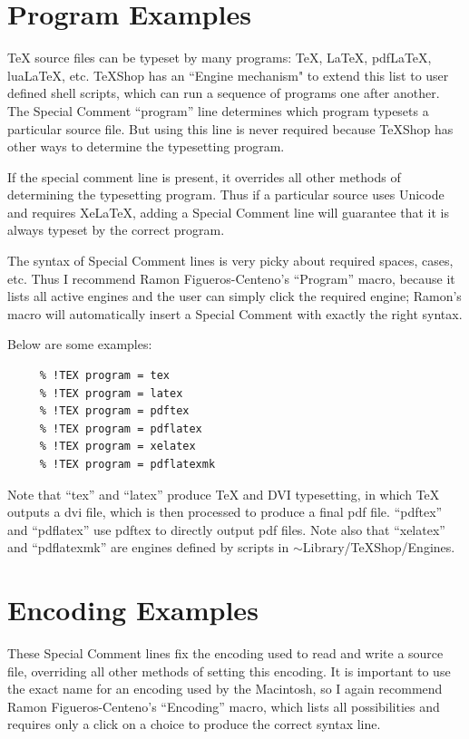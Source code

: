 \documentclass[11pt, oneside]{article}   	%
\begin{document}
\section{Program Examples}

TeX source files can be typeset by many programs: TeX, LaTeX, pdfLaTeX, luaLaTeX, etc. TeXShop has an ``Engine mechanism" to extend this list to user defined shell scripts, which can run a sequence of programs one after another. The Special Comment ``program'' line determines which program typesets a particular source file. But using this line is never required because TeXShop has other ways to determine the typesetting program.

If the special comment line is present, it overrides all other methods of determining the typesetting program. Thus if a particular source uses Unicode and requires XeLaTeX, adding a Special Comment line will guarantee that it is always typeset by the correct program.

The syntax of Special Comment lines is very picky about required spaces, cases, etc. Thus I recommend 
Ramon Figueros-Centeno's ``Program'' macro, because it lists all active engines and the user can simply click the required engine; Ramon's macro will automatically insert a Special Comment with exactly the right syntax.

Below are some examples:

\begin{verbatim}
     % !TEX program = tex               
     % !TEX program = latex
     % !TEX program = pdftex
     % !TEX program = pdflatex
     % !TEX program = xelatex
     % !TEX program = pdflatexmk
\end{verbatim}

Note that ``tex'' and ``latex'' produce TeX and DVI typesetting, in which TeX outputs a dvi file, which is then processed to produce a final pdf file. ``pdftex'' and ``pdflatex'' use pdftex to directly output pdf files.
Note also that ``xelatex'' and ``pdflatexmk'' are engines defined by scripts in $\sim$Library/TeXShop/Engines.

\section{Encoding Examples}

These Special Comment lines fix the encoding used to read and write a source file, overriding all other methods of setting this encoding. It is important to use the exact name for an encoding used by the Macintosh, so I again recommend Ramon Figueros-Centeno's ``Encoding'' macro, which lists all possibilities and requires only a click on a choice to produce the correct syntax line.
 
\end{document}

